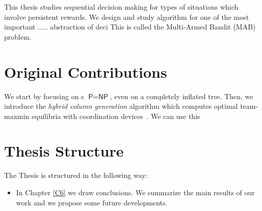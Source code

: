 This thesis studies sequential decision making for types of situations which involve persistent rewards. We design and study algorithm for one of the most important  ..... abstraction of deci This is called the Multi-Armed Bandit (MAB) problem.













\section{Original Contributions}
We start by focusing on s $\textsf{P} = \textsf{NP}$, even on a completely inflated tree.
Then, we introduce the \emph{hybrid column generation} algorithm which computes optimal team-maxmin equilibria with coordination devices~\citep{celli18}. We can use this 


\section{Thesis Structure}

The Thesis is structured in the following way:
\begin{itemize}
    \item In Chapter \ref{C6} we draw conclusions. We summarize the main results of our work and we propose some future developments.
\end{itemize}




